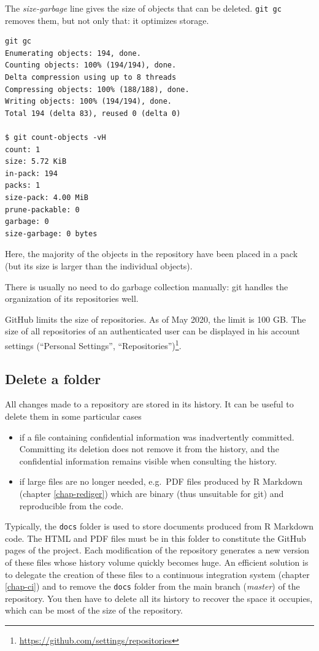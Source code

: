 \documentclass[
  12pt,
  american,
  a4paper,
  extrafontsizes,onecolumn,openright
  ]{memoir}
\providecommand{\tightlist}{%
  \setlength{\itemsep}{0pt}\setlength{\parskip}{0pt}}
\begin{document}
The \emph{size-garbage} line gives the size of objects that can be deleted.
\texttt{git\ gc} removes them, but not only that: it optimizes storage.

\begin{verbatim}
git gc
Enumerating objects: 194, done.
Counting objects: 100% (194/194), done.
Delta compression using up to 8 threads
Compressing objects: 100% (188/188), done.
Writing objects: 100% (194/194), done.
Total 194 (delta 83), reused 0 (delta 0)

$ git count-objects -vH
count: 1
size: 5.72 KiB
in-pack: 194
packs: 1
size-pack: 4.00 MiB
prune-packable: 0
garbage: 0
size-garbage: 0 bytes
\end{verbatim}

Here, the majority of the objects in the repository have been placed in a pack (but its size is larger than the individual objects).

There is usually no need to do garbage collection manually: git handles the organization of its repositories well.

GitHub limits the size of repositories.
As of May 2020, the limit is 100 GB.
The size of all repositories of an authenticated user can be displayed in his account settings (\enquote{Personal Settings}, \enquote{Repositories})\footnote{\url{https://github.com/settings/repositories}}.

\hypertarget{delete-a-folder}{%
\subsection{Delete a folder}\label{delete-a-folder}}

All changes made to a repository are stored in its history.
It can be useful to delete them in some particular cases

\begin{itemize}
\tightlist
\item
  if a file containing confidential information was inadvertently committed.
  Committing its deletion does not remove it from the history, and the confidential information remains visible when consulting the history.
\item
  if large files are no longer needed, e.g.~PDF files produced by R Markdown (chapter \ref{chap-rediger}) which are binary (thus unsuitable for git) and reproducible from the code.
\end{itemize}

Typically, the \texttt{docs} folder is used to store documents produced from R Markdown code.
The HTML and PDF files must be in this folder to constitute the GitHub pages of the project.
Each modification of the repository generates a new version of these files whose history volume quickly becomes huge.
An efficient solution is to delegate the creation of these files to a continuous integration system (chapter \ref{chap-ci}) and to remove the \texttt{docs} folder from the main branch (\emph{master}) of the repository.
You then have to delete all its history to recover the space it occupies, which can be most of the size of the repository.
\end{document}
